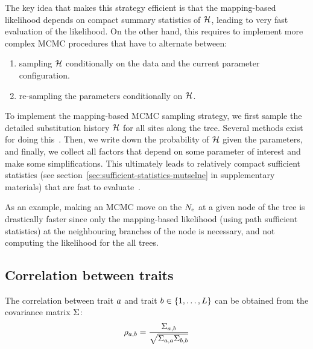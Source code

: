 The key idea that makes this strategy efficient is that the mapping-based likelihood depends on compact summary statistics of $\mathcal{H}$, leading to very fast evaluation of the likelihood.
On the other hand, this requires to implement more complex \acrshort{MCMC} procedures that have to alternate between:
\begin{enumerate}
    \item sampling $\mathcal{H}$ conditionally on the data and the current parameter configuration.
    \item re-sampling the parameters conditionally on $\mathcal{H}$.
\end{enumerate}

To implement the mapping-based \acrshort{MCMC} sampling strategy, we first sample the detailed substitution history $\mathcal{H}$ for all sites along the tree.
Several methods exist for doing this~\citep{Nielsen2002,Rodrigue2008}.
Then, we write down the probability of $\mathcal{H}$ given the parameters, and finally, we collect all factors that depend on some parameter of interest and make some simplifications.
This ultimately leads to relatively compact sufficient statistics (see section~\ref{sec:sufficient-statistics-mutselne} in supplementary materials) that are fast to evaluate~\citep{Irvahn2014,Davydov2016}.

As an example, making an \acrshort{MCMC} move on the $N_{\mathrm{e}}$ at a given node of the tree is drastically faster since only the mapping-based likelihood (using path sufficient statistics) at the neighbouring branches of the node is necessary, and not computing the likelihood for the all trees.

\subsection{Correlation between traits}
\label{sec:Correlation}
The correlation between trait $a$ and trait $b \in \{1, \hdots, L\}$ can be obtained from the covariance matrix $\Sigma$:
\begin{equation}
    \rho_{a, b} = \dfrac{\Sigma_{a, b}}{\sqrt{\Sigma_{a, a} \Sigma_{b, b}}}
\end{equation}

